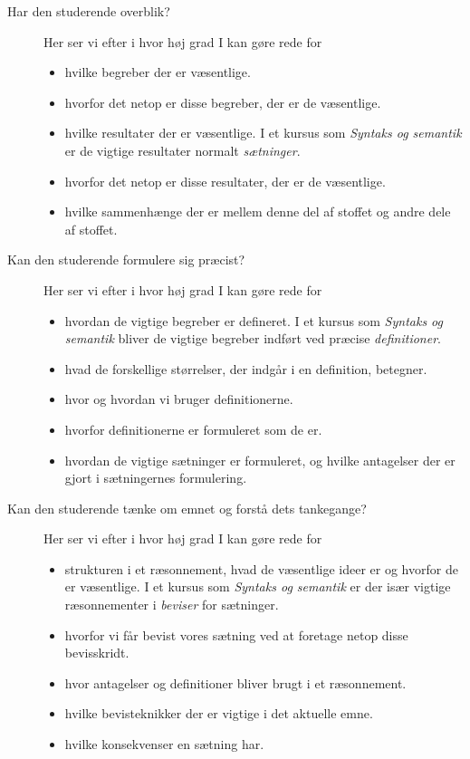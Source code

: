 \documentclass[11pt,a4paper,article,oneside]{memoir}
\begin{document}
\begin{description}
\item[\quad Har den studerende  overblik?]
  
  Her ser vi efter i hvor høj grad I kan gøre rede for
  \begin{itemize}
  \item hvilke begreber der er væsentlige.
  \item hvorfor det netop er disse begreber, der er de væsentlige.
  \item hvilke resultater der er væsentlige.  I et kursus som \emph{Syntaks
      og semantik} er de vigtige resultater normalt \emph{sætninger}.
  \item hvorfor det netop er disse resultater, der er de væsentlige.
  \item hvilke sammenhænge der er mellem denne del af stoffet og andre dele
    af stoffet.
  \end{itemize}
  
\item[\quad Kan den studerende formulere sig præcist?]
  
  Her ser vi efter i hvor høj grad I kan gøre rede for
  \begin{itemize}
  \item hvordan de vigtige begreber er defineret. I et kursus som
    \emph{Syntaks og semantik} bliver de vigtige begreber indført ved
    præcise \emph{definitioner}.
  \item hvad de forskellige størrelser, der indgår i en definition,
    betegner.
  \item hvor og hvordan vi bruger definitionerne.
  \item hvorfor definitionerne er formuleret som de er.
  \item hvordan de vigtige sætninger er formuleret, og hvilke antagelser der
    er gjort i sætningernes formulering.
  \end{itemize}
  
\item[\quad Kan den studerende tænke om emnet og forstå dets tankegange?]
  
  Her ser vi efter i hvor høj grad I kan gøre rede for
  \begin{itemize}
  \item strukturen i et ræsonnement, hvad de væsentlige ideer er og hvorfor
    de er væsentlige. I et kursus som \emph{Syntaks og semantik} er der især
    vigtige ræsonnementer i \emph{beviser} for sætninger.
  \item hvorfor vi får bevist vores sætning ved at foretage netop disse
    bevisskridt.
  \item hvor antagelser og definitioner bliver brugt i et ræsonnement.
  \item hvilke bevisteknikker der er vigtige i det aktuelle emne.
  \item hvilke konsekvenser en sætning har.
  \end{itemize}
  

\end{description}
\end{document}
